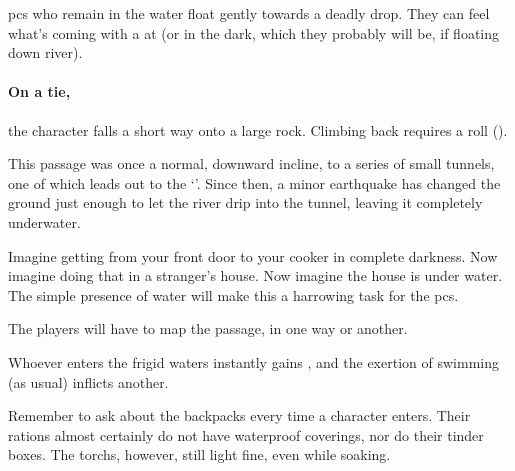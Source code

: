 \begin{multicols}{2}




\Glspl{pc} who remain in the water float gently towards a deadly drop.
They can feel what's coming with a  at \tn[7] (or \tn[10] in the dark, which they probably will be, if floating down river).

\paragraph{On a tie,}
the character falls a short way onto a large rock.
Climbing back requires a  roll (\tn[10]).



\playCommentaryTeamwork[t]


\begin{exampletext}
  This passage was once a normal, downward incline, to a series of small tunnels, one of which leads out to the `'.
  Since then, a minor earthquake has changed the ground just enough to let the river drip into the tunnel, leaving it completely underwater.
\end{exampletext}

Imagine getting from your front door to your cooker in complete darkness.
Now imagine doing that in a stranger's house.
Now imagine the house is under water.
The simple presence of water will make this a harrowing task for the \glspl{pc}.

The players will have to map the passage, in one way or another.

Whoever enters the frigid waters instantly gains , and the exertion of swimming (as usual) inflicts another.

Remember to ask about the backpacks every time a character enters.
Their \glspl{ration} almost certainly do not have waterproof coverings, nor do their tinder boxes.
The \glspl{torch}, however, still light fine, even while soaking.


\end{multicols}
